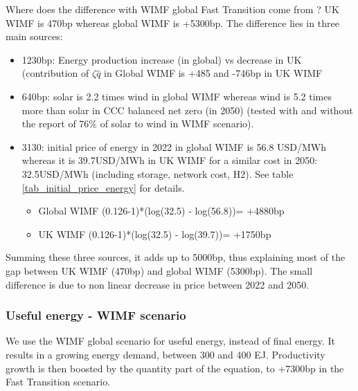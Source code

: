 Where does the difference with WIMF global Fast Transition come from ? UK WIMF is 470bp whereas global WIMF is +5300bp. 
The difference lies in three main sources:
\begin{itemize}
    \item 1230bp: Energy production increase (in global) vs decrease in UK (contribution of $\zeta\hat{q}$ in Global WIMF is +485 and -746bp in UK WIMF
    \item 640bp: solar is 2.2 times wind in global WIMF whereas wind is 5.2 times more than solar in CCC balanced net zero (in 2050) (tested with and without the report of 76\% of solar to wind in WIMF scenario). 
    \item 3130: initial price of energy in 2022 in global WIMF is 56.8 USD/MWh whereas it is 39.7USD/MWh in UK WIMF for a similar cost in 2050: 32.5USD/MWh (including storage, network cost, H2). See table \ref{tab_initial_price_energy} for details.
    \begin{itemize}
        \item Global WIMF (0.126-1)*(log(32.5) - log(56.8))= +4880bp
        \item UK WIMF (0.126-1)*(log(32.5) - log(39.7))= +1750bp
    \end{itemize}
\end{itemize}

Summing these three sources, it adds up to 5000bp, thus explaining most of the gap between UK WIMF (470bp) and global WIMF (5300bp). The small difference is due to non linear decrease in price between 2022 and 2050.




\subsubsection{Useful energy - WIMF scenario}

We use the WIMF global scenario for useful energy, instead of final energy. It results in a growing energy demand, between 300 and 400 EJ. Productivity growth is then boosted by the quantity part of the equation, to +7300bp in the Fast Transition scenario. 



